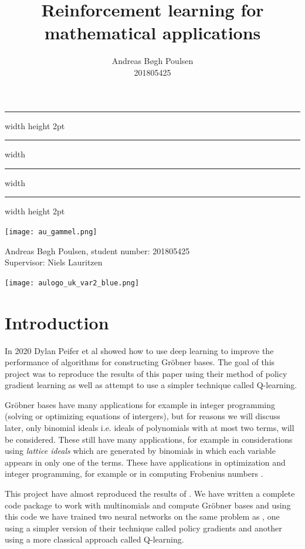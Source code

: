 \documentclass{article}
\title{Reinforcement learning for mathematical applications}
\author{
    Andreas Bøgh Poulsen\\
    201805425
}
\theoremstyle{changedot}
\theoremstyle{changedotbreak}
\theoremstyle{nonumberplain}
\begin{document}
\begin{titlepage}
  \center \sc
  \hrule width \hsize height 2pt \kern 1mm \hrule width \hsize
  \vspace{4mm}
  \vspace{6mm}
  \hrule width \hsize \kern 1mm \hrule width \hsize height 2pt
  \vspace{10mm}

  \vspace{10mm}

  \texttt{[image: au\_gammel.png]}

  \vspace{15mm}

  {\large Andreas Bøgh Poulsen, student number: 201805425 \\ Supervisor: Niels Lauritzen}

  \vspace{7mm}

  \texttt{[image: aulogo\_uk\_var2\_blue.png]}
\end{titlepage}


\section{Introduction}
In 2020 Dylan Peifer et al \cite{peifer} showed how to use deep learning to improve the performance of algorithms for constructing Gröbner bases. The goal of this project was to reproduce the results of this paper using their method of policy gradient learning as well as attempt to use a simpler technique called Q-learning.

Gröbner bases have many applications for example in integer programming (solving or optimizing equations of intergers), but for reasons we will discuss later, only binomial ideals i.e. ideals of polynomials with at most two terms, will be considered. These still have many applications, for example in considerations using \emph{lattice ideals} which are generated by binomials in which each variable appears in only one of the terms. These have applications in optimization and integer programming, for example \cite{lattice} or in computing Frobenius numbers \cite{frobenius}.

This project have almost reproduced the results of \cite{peifer}. We have written a complete code package to work with multinomials and compute Gröbner bases and using this code we have trained two neural networks on the same problem as \cite{peifer}, one using a simpler version of their technique called policy gradients and another using a more classical approach called Q-learning. 
\end{document}
